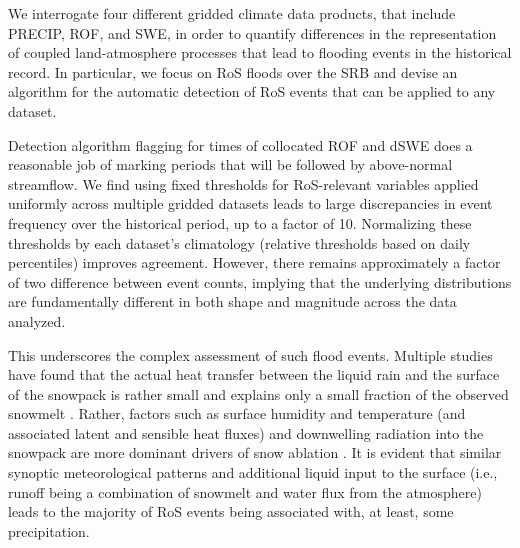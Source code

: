 \documentclass[nhess, manuscript]{copernicus}
\begin{document}
\conclusions

We interrogate four different gridded climate data products, that include PRECIP, ROF, and SWE, in order to quantify differences in the representation of coupled land-atmosphere processes that lead to flooding events in the historical record.
In particular, we focus on RoS floods over the SRB and devise an algorithm for the automatic detection of RoS events that can be applied to any dataset. 

Detection algorithm flagging for times of collocated ROF and dSWE does a reasonable job of marking periods that will be followed by above-normal streamflow. 
We find using fixed thresholds for RoS-relevant variables applied uniformly across multiple gridded datasets leads to large discrepancies in event frequency over the historical period, up to a factor of 10. 
Normalizing these thresholds by each dataset's climatology (relative thresholds based on daily percentiles) improves agreement. 
However, there remains approximately a factor of two difference between event counts, implying that the underlying distributions are fundamentally different in both shape and magnitude across the data analyzed.


This underscores the complex assessment of such flood events. 
Multiple studies have found that the actual heat transfer between the liquid rain and the surface of the snowpack is rather small and explains only a small fraction of the observed snowmelt \citep{moore1984controls}. 
Rather, factors such as surface humidity and temperature (and associated latent and sensible heat fluxes) and downwelling radiation into the snowpack are more dominant drivers of snow ablation \citep{mazurkiewicz2008assessing,wurzer2016influence,harpold2018humidity}. 
It is evident that similar synoptic meteorological patterns \citep{grote2021synoptic} and additional liquid input to the surface (i.e., runoff being a combination of snowmelt and water flux from the atmosphere) leads to the majority of RoS events being associated with, at least, some precipitation.
\end{document}

